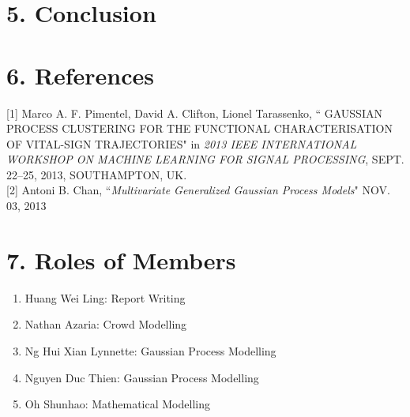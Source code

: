 \documentclass[letterpaper]{article}
\begin{document}

\section{5.  Conclusion}

\section{6.  References}

[1] Marco A. F. Pimentel, David A. Clifton, Lionel Tarassenko, `` GAUSSIAN PROCESS CLUSTERING FOR THE FUNCTIONAL CHARACTERISATION OF VITAL-SIGN TRAJECTORIES"
 in {\it 2013 IEEE INTERNATIONAL WORKSHOP ON MACHINE LEARNING FOR SIGNAL PROCESSING}, SEPT. 22–25, 2013, SOUTHAMPTON, UK. \\

[2] Antoni B. Chan, ``{\it Multivariate Generalized Gaussian Process Models}" NOV. 03, 2013

\section{7. Roles of Members}
\begin{enumerate}
\item Huang Wei Ling: Report Writing
\item Nathan Azaria: Crowd Modelling 
\item Ng Hui Xian Lynnette: Gaussian Process Modelling
\item Nguyen Duc Thien: Gaussian Process Modelling
\item Oh Shunhao: Mathematical Modelling
\end{enumerate}
\end{document}
